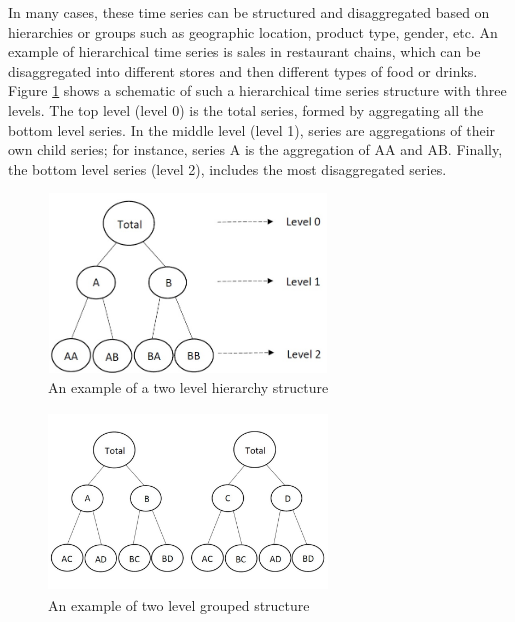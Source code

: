 \documentclass[11pt,a4paper,]{article}
\begin{document}
In many cases, these time series can be structured and disaggregated
based on hierarchies or groups such as geographic location, product
type, gender, etc. An example of hierarchical time series is sales in
restaurant chains, which can be disaggregated into different stores and
then different types of food or drinks. Figure
\ref{fig:hierarchicalexample} shows a schematic of such a hierarchical
time series structure with three levels. The top level (level 0) is the
total series, formed by aggregating all the bottom level series. In the
middle level (level 1), series are aggregations of their own child
series; for instance, series A is the aggregation of AA and AB. Finally,
the bottom level series (level 2), includes the most disaggregated
series.

\begin{figure}

{\centering \includegraphics[width=280px,height=180px]{Paper-Figures/hierarchical_example} 

}

\caption{An example of a two level hierarchy structure}\label{fig:hierarchicalexample}
\end{figure}

\begin{figure}

{\centering \includegraphics[width=280px,height=180px]{hcf_files/figure-latex/groupexample-1} 

}

\caption{An example of two level grouped structure}\label{fig:groupexample}
\end{figure}
\end{document}
